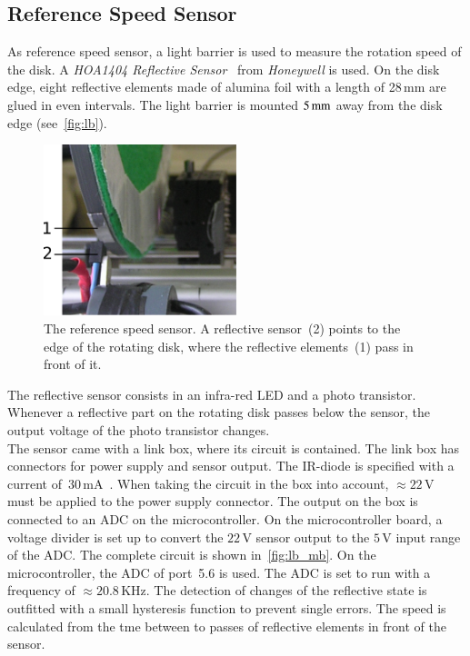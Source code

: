 \documentclass[12pt,a4paper]{article}
\newcommand{\mm}[1]{$\unit[#1]{mm}$}
\begin{document}
\subsection{Reference Speed Sensor}
\label{lb}

As reference speed sensor, a light barrier is used to measure the rotation speed of the disk.
A \emph{HOA1404 Reflective Sensor}~\cite{hoa} from \emph{Honeywell} is used.
On the disk edge, eight reflective elements made of alumina foil with a length of 28\,mm are glued in even intervals.
The light barrier is mounted \mm{5} away from the disk edge (see~\autoref{fig:lb}).

\begin{figure}[htbp]
\begin{center}
\includegraphics[width=0.5\textwidth]{figures/light_barrier.pdf}
\caption{\label{fig:lb}
The reference speed sensor.
A reflective sensor~(2) points to the edge of the rotating disk, where the reflective elements~(1) pass in front of it.
}
\end{center}
\end{figure}

The reflective sensor consists in an infra-red LED and a photo transistor.
Whenever a reflective part on the rotating disk passes below the sensor, the output voltage of the photo transistor changes.\\
The sensor came with a link box, where its circuit is contained.
The link box has connectors for power supply and sensor output.
The IR-diode is specified with a current of~$30\,$mA~\cite{hoa}.
When taking the circuit in the box into account, $\approx 22$\,V must be applied to the power supply connector.
The output on the box is connected to an ADC on the microcontroller.
On the microcontroller board, a voltage divider is set up to convert the $22\,$V sensor output to the $5\,$V input range of the ADC.
The complete circuit is shown in~\autoref{fig:lb_mb}.
On the microcontroller, the ADC of port~5.6 is used. 
The ADC is set to run with a frequency of $\approx 20.8$\,KHz.
The detection of changes of the reflective state is outfitted with a small hysteresis function to prevent single errors.
The speed is calculated from the tme between to passes of reflective elements in front of the sensor.
\end{document}
